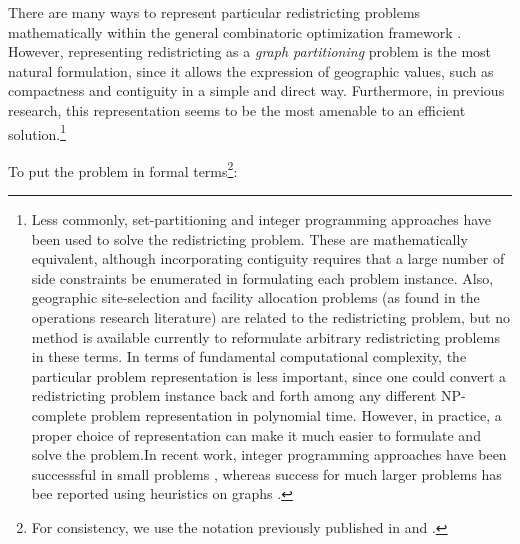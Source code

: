 \documentclass[article]{JSSstyle/jss}
\begin{document}
There are many ways to represent particular redistricting problems 
mathematically within the general combinatoric optimization 
framework \citep[][]{Altman97}. However, representing redistricting 
as a \emph{graph partitioning} problem is the most natural formulation, 
since it allows the expression of geographic values, such as compactness 
and contiguity in a simple and direct way. Furthermore, in previous 
research, this representation seems to be the most amenable 
to an efficient solution.\footnote{Less commonly, set-partitioning and integer programming 
approaches have been used to solve the redistricting problem. These 
are mathematically equivalent, although incorporating contiguity 
requires that a large number of side constraints be enumerated in 
formulating each problem instance. Also, geographic site-selection and 
facility allocation problems (as found in the operations research 
literature) are related to the redistricting problem, but no 
method is available currently to reformulate arbitrary 
redistricting problems in these terms. In terms of fundamental 
computational complexity, the particular problem representation is 
less important, since one could convert a redistricting problem 
instance back and forth among any different NP-complete problem 
representation in polynomial time. However, in practice, a proper 
choice of representation can make it much easier to formulate and 
solve the problem.In recent work,  integer programming approaches have been successsful in small problems  \citep[see][]{AerEisHeu03}, whereas success for much larger problems has bee reported using heuristics on graphs \citep[see][]{Xiao06}.}  

To put the problem in formal terms\footnote{For consistency, we use the notation previously published in \citet{Altman97} and \citet{AltmanThesis}.}:
\end{document}
